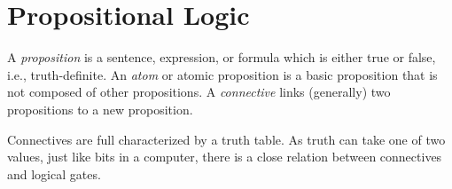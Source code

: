 





\section{Propositional Logic}
\begin{definition}
  A \emph{proposition} is a sentence, expression, or formula which is either true or false, i.e., truth-definite.
  An \emph{atom} or atomic proposition is a basic proposition that is not composed of other propositions.
  A \emph{connective} links (generally) two propositions to a new proposition.
\end{definition}
Connectives are full characterized by a truth table.
As truth can take one of two values, just like bits in a computer, there is a close relation between connectives and logical gates.
